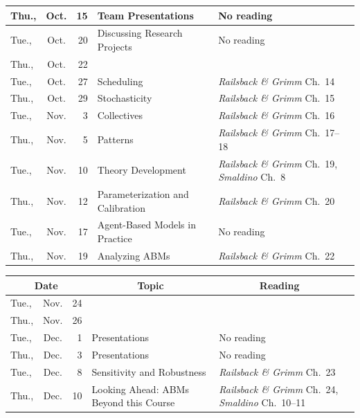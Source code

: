 \documentclass[11pt,twoside]{jgsyllabus}\usepackage[]{graphicx}\usepackage[]{xcolor}
\begin{document}
\begin{center}
\begin{tabular}{l@{~}c@{~}r>{\raggedright}m{2.6in}>{\centering}m{2in}c}
   \midrule
Thu., & Oct. &  15 & Team Presentations & No reading &  \\ 
   \midrule
Tue., & Oct. &  20 & Discussing Research Projects & No reading &  \\ 
   \midrule
Thu., & Oct. &  22 & \multicolumn{2}{l}{\bfseries\scshape\large Fall Break} & \\%
   \midrule
Tue., & Oct. &  27 & Scheduling & \emph{Railsback \& Grimm\/} Ch.~14 &  \\ 
   \midrule
Thu., & Oct. &  29 & Stochasticity & \emph{Railsback \& Grimm\/} Ch.~15 &  \\ 
   \midrule
Tue., & Nov. &   3 & Collectives & \emph{Railsback \& Grimm\/} Ch.~16 &  \\ 
   \midrule
Thu., & Nov. &   5 & Patterns & \emph{Railsback \& Grimm\/} Ch.~17--18 &  \\ 
   \midrule
Tue., & Nov. &  10 & Theory Development & \emph{Railsback \& Grimm\/} Ch.~19, \emph{Smaldino\/} Ch.~8 &  \\ 
   \midrule
Thu., & Nov. &  12 & Parameterization and Calibration & \emph{Railsback \& Grimm\/} Ch.~20 &  \\ 
   \midrule
Tue., & Nov. &  17 & Agent-Based Models in Practice & No reading &  \\ 
   \midrule
Thu., & Nov. &  19 & Analyzing ABMs & \emph{Railsback \& Grimm\/} Ch.~22 &  \\ 
   \bottomrule
\end{tabular}

\end{center}

\begin{center}
\begin{tabular}{l@{~}c@{~}r>{\raggedright}m{2.6in}>{\centering}m{2in}c}
  \toprule
  \multicolumn{3}{c}{\bfseries Date} & \multicolumn{1}{c}{\bfseries Topic} &\multicolumn{1}{c}{\bfseries Reading} &\\
 \midrule
Tue., & Nov. &  24 & \multicolumn{2}{l}{\multirow{3}{*}{\bfseries\scshape\Large Thanksgiving Break}} & \\%
  Thu., & Nov. &  26 &  &  &  \\ 
   \midrule
Tue., & Dec. &   1 & Presentations & No reading &  \\ 
   \midrule
Thu., & Dec. &   3 & Presentations & No reading &  \\ 
   \midrule
Tue., & Dec. &   8 & Sensitivity and Robustness & \emph{Railsback \& Grimm\/} Ch.~23 &  \\ 
   \midrule
Thu., & Dec. &  10 & Looking Ahead: ABMs Beyond this Course & \emph{Railsback \& Grimm\/} Ch.~24, \emph{Smaldino\/} Ch.~10--11 &  \\ 
   \bottomrule
\end{tabular}

\end{center}
%
\end{document}
